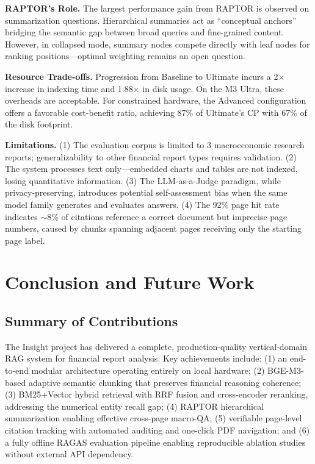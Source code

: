 \documentclass[11pt, a4paper]{article}
\begin{document}
\noindent\textbf{RAPTOR's Role.} The largest performance gain from RAPTOR is observed on summarization questions. Hierarchical summaries act as ``conceptual anchors'' bridging the semantic gap between broad queries and fine-grained content. However, in collapsed mode, summary nodes compete directly with leaf nodes for ranking positions---optimal weighting remains an open question.

\noindent\textbf{Resource Trade-offs.} Progression from Baseline to Ultimate incurs a 2$\times$ increase in indexing time and 1.88$\times$ in disk usage. On the M3 Ultra, these overheads are acceptable. For constrained hardware, the Advanced configuration offers a favorable cost-benefit ratio, achieving 87\% of Ultimate's CP with 67\% of the disk footprint.

\noindent\textbf{Limitations.} (1) The evaluation corpus is limited to 3 macroeconomic research reports; generalizability to other financial report types requires validation. (2) The system processes text only---embedded charts and tables are not indexed, losing quantitative information. (3) The LLM-as-a-Judge paradigm, while privacy-preserving, introduces potential self-assessment bias when the same model family generates and evaluates answers. (4) The 92\% page hit rate indicates $\sim$8\% of citations reference a correct document but imprecise page numbers, caused by chunks spanning adjacent pages receiving only the starting page label.

\section{Conclusion and Future Work}

\subsection{Summary of Contributions}

The Insight project has delivered a complete, production-quality
vertical-domain RAG system for financial report analysis. Key achievements
include: (1) an end-to-end modular architecture operating entirely on local
hardware; (2) BGE-M3-based adaptive semantic chunking that preserves financial
reasoning coherence; (3) BM25+Vector hybrid retrieval with RRF fusion and
cross-encoder reranking, addressing the numerical entity recall gap; (4) RAPTOR
hierarchical summarization enabling effective cross-page macro-QA; (5)
verifiable page-level citation tracking with automated auditing and one-click
PDF navigation; and (6) a fully offline RAGAS evaluation pipeline enabling
reproducible ablation studies without external API dependency.
\end{document}
